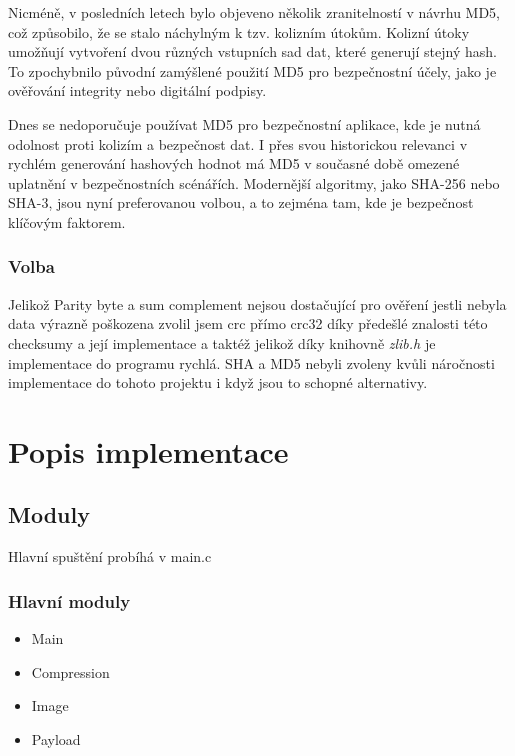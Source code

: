 \documentclass[12pt]{report}
\begin{document}
    Nicméně, v posledních letech bylo objeveno několik zranitelností v návrhu MD5, což způsobilo, že se stalo náchylným k tzv. kolizním útokům. Kolizní útoky umožňují vytvoření dvou různých vstupních sad dat, které generují stejný hash. To zpochybnilo původní zamýšlené použití MD5 pro bezpečnostní účely, jako je ověřování integrity nebo digitální podpisy.

    Dnes se nedoporučuje používat MD5 pro bezpečnostní aplikace, kde je nutná odolnost proti kolizím a bezpečnost dat. I přes svou historickou relevanci v rychlém generování hashových hodnot má MD5 v současné době omezené uplatnění v bezpečnostních scénářích. Modernější algoritmy, jako SHA-256 nebo SHA-3, jsou nyní preferovanou volbou, a to zejména tam, kde je bezpečnost klíčovým faktorem.
    \cite{MD5Wikip50:online}

\subsection{Volba}
    Jelikož Parity byte a sum complement nejsou dostačující pro ověření jestli nebyla data výrazně poškozena zvolil jsem crc přímo crc32 díky předešlé znalosti této checksumy a její implementace a taktéž jelikož díky knihovně \textit{zlib.h} je implementace do programu rychlá. SHA a MD5 nebyli zvoleny kvůli náročnosti implementace do tohoto projektu i když jsou to schopné alternativy.




    \chapter{Popis implementace}
 
\section{   Moduly}
    Hlavní spuštění probíhá v main.c
    
   
\subsection{Hlavní moduly}
    \begin{itemize}
        \item Main
        \item Compression
        \item Image
        \item Payload
    \end{itemize}
\end{document}
